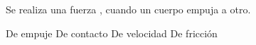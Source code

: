 
\question Se realiza una fuerza \fillin \enspace, cuando un cuerpo empuja
          a otro.

  \begin{oneparchoices}
    \choice De empuje
    \CorrectChoice De contacto
    \choice De velocidad
    \choice De fricción
  \end{oneparchoices}
  \answerline[B]
